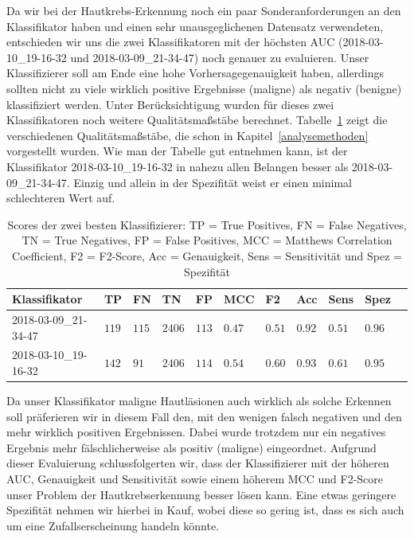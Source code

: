 Da wir bei der Hautkrebs-Erkennung noch ein paar Sonderanforderungen an den Klassifikator haben und einen sehr unausgeglichenen Datensatz verwendeten, entschieden wir uns die zwei Klassifikatoren mit der höchsten AUC (2018-03-10\_19-16-32 und 2018-03-09\_21-34-47) noch genauer zu evaluieren. Unser Klassifizierer soll am Ende  eine hohe Vorhersagegenauigkeit haben, allerdings sollten nicht zu viele wirklich positive Ergebnisse (maligne) als negativ (benigne) klassifiziert werden. Unter Berücksichtigung wurden für dieses zwei Klassifikatoren noch weitere Qualitätsmaßstäbe berechnet. Tabelle~\ref{tab:scores} zeigt die verschiedenen Qualitätsmaßstäbe, die schon in Kapitel~\ref{analysemethoden} vorgestellt wurden. Wie man der Tabelle gut entnehmen kann, ist der Klassifikator 2018-03-10\_19-16-32 in nahezu allen Belangen besser als 2018-03-09\_21-34-47. Einzig und allein in der Spezifität weist er einen minimal schlechteren Wert auf.

\begin{table}[htb!]
\begin{center}
\begin{tabular}{lllllllllll}
	\toprule
 	Klassifikator  & TP & FN & TN & FP & MCC & F2 & Acc & Sens & Spez\\
	\midrule
	2018-03-09\_21-34-47 & $119$ &	$115$ &	$2406$ &	$113$ &	$0.47$ &	$0.51$&	$0.92$ &	$0.51$ & $0.96$\\
    2018-03-10\_19-16-32 & $142$&	$91$ &	$2406$ &	$114$ &	$0.54$ 	&$0.60$	&$0.93$	&$0.61$&	$0.95$ \\
 \bottomrule
 \end{tabular}
 \end{center}
  \caption{Scores der zwei besten Klassifizierer: TP = True Positives, FN = False Negatives, TN = True Negatives, FP = False Positives, MCC = Matthews Correlation Coefficient, F2 = F2-Score, Acc = Genauigkeit, Sens = Sensitivität und Spez = Spezifität }
 \label{tab:scores}
 \end{table}
 
Da unser Klassifikator maligne Hautläsionen auch wirklich als solche Erkennen soll präferieren wir in diesem Fall den, mit den wenigen falsch negativen und den mehr wirklich positiven Ergebnissen. Dabei wurde trotzdem nur ein negatives Ergebnis mehr fälschlicherweise als positiv (maligne) eingeordnet. Aufgrund dieser Evaluierung schlussfolgerten wir, dass der Klassifizierer mit der höheren AUC, Genauigkeit und Sensitivität sowie einem  höherem MCC und F2-Score unser Problem der Hautkrebserkennung besser lösen kann. Eine etwas geringere Spezifität nehmen wir hierbei in Kauf, wobei diese so gering ist, dass es sich auch um eine Zufallserscheinung handeln könnte.
 
